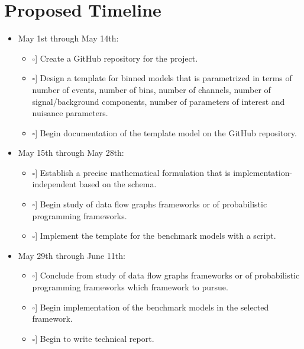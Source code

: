 \newcommand{\checkedBox}{\makebox[0pt][l]{$\square$}\raisebox{.15ex}{\hspace{0.1em}$\checkmark$}}
\newcommand{\uncheckedBox}{\makebox[0pt][l]{$\square$}\raisebox{.15ex}{\hspace{0.1em}\phantom{$\checkmark$}}}

\section{Proposed Timeline}

\begin{itemize}
	\item May 1st through May 14th:
	      \begin{itemize}
	      	\item [\uncheckedBox] Create a GitHub repository for the project.
	      	\item [\uncheckedBox] Design a template for binned models that is parametrized in terms of number of events, number of bins, number of channels, number of signal/background components, number of parameters of interest and nuisance parameters.
	      	\item [\uncheckedBox] Begin documentation of the template model on the GitHub repository.
	      \end{itemize}
	\item May 15th through May 28th:
	      \begin{itemize}
	      	\item [\uncheckedBox] Establish a precise mathematical formulation that is implementation-independent based on the  schema.
	      	\item [\uncheckedBox] Begin study of data flow graphs frameworks or of probabilistic programming frameworks.
	      	\item [\uncheckedBox] Implement the template for the benchmark models with a  script.
	      \end{itemize}
	\item May 29th through June 11th:
	      \begin{itemize}
	      	\item [\uncheckedBox] Conclude from study of data flow graphs frameworks or of probabilistic programming frameworks which framework to pursue.
	      	\item [\uncheckedBox] Begin implementation of the benchmark models in the selected framework.
	      	\item [\uncheckedBox] Begin to write technical report.

\end{itemize}
\end{itemize}
